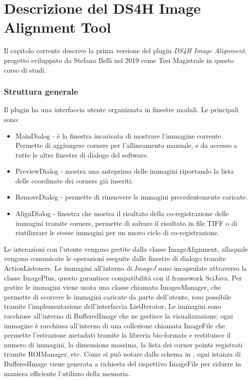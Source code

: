 \chapter{Descrizione del DS4H Image Alignment Tool}
\label{chap:descriptionoldtool}
\noindent Il capitolo corrente descrive la prima versione del plugin \textit{DS4H Image Alignment}, progetto sviluppato da Stefano Belli nel 2019 come Tesi Magistrale in questo corso di studi.

\subsection{Struttura generale}
\noindent Il plugin ha una interfaccia utente organizzata in finestre modali. Le principali sono:
\begin{itemize}
	\item MainDialog - è la finestra incaricata di mostrare l’immagine corrente. Permette di aggiungere corners per l’allineamento manuale, e da accesso a tutte le altre finestre di dialogo del software.
	\item PreviewDialog - mostra una anteprima delle immagini riportando la lista delle coordinate dei corners già inseriti.
	\item RemoveDialog - permette di rimuovere le immagini precedentemente caricate.
	\item AlignDialog - finestra che mostra il risultato della co-registrazione delle immagini tramite corners, permette di salvare il risultato in file TIFF o di riutilizzare le stesse immagini per un nuovo ciclo di co-registrazione.
\end{itemize}

\noindent Le interazioni con l’utente vengono gestite dalla classe ImageAlignment, allaquale vengono comunicate le operazioni eseguite dalle finestre di dialogo tramite ActionListeners. Le immagini all’interno di \textit{ImageJ} sono incapsulate attraverso la classe ImagePlus, questo garantisce compatibilità con il framework SciJava. Per gestire le immagini viene usata una classe chiamata ImagesManager, che permette di scorrere le immagini caricate da parte dell’utente, reso possibile tramite l’implementazione dell’interfaccia ListIterator.
Le immagini sono racchiuse all’interno di BufferedImage che ne gestisce la visualizzazione; ogni immagine è racchiusa all’interno di una collezione chiamata ImageFile che permette l’estrazione metadati tramite la libreria bio-formats e restituisce il numero di immagini, la dimensione massima, la lista dei corner points registrati tramite ROIManager, etc.
Come si può notare dallo schema in , ogni istanza di BufferedImage viene generata a richiesta del rispettivo ImageFile per ridurre in maniera efficiente l’utilizzo della memoria.


